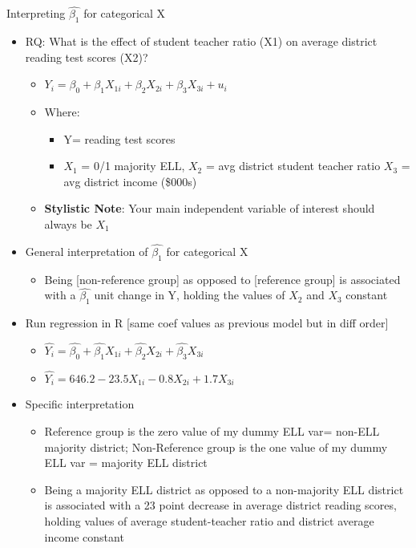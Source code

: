 \documentclass[8pt,ignorenonframetext,dvipsnames]{beamer}
\providecommand{\tightlist}{%
  \setlength{\itemsep}{0pt}\setlength{\parskip}{0pt}}
\renewcommand{\textbf}[1]{{\color{darkgray}\bfseries\fontfamily{Montserrat-TOsF}#1}}
\let\olditem\item
\renewcommand{\item}{%
  \olditem\vspace{4pt}
}
\begin{document}
\begin{frame}{Interpreting \(\hat{\beta_1}\) for categorical X}
\protect\hypertarget{interpreting-hatbeta_1-for-categorical-x}{}

\begin{itemize}
\tightlist
\item
  RQ: What is the effect of student teacher ratio (X1) on average
  district reading test scores (X2)?

  \begin{itemize}
  \tightlist
  \item
    \(Y_i = \beta_0 + \beta_1X_{1i} + \beta_2X_{2i} + \beta_3X_{3i} + u_i\)
  \item
    Where:

    \begin{itemize}
    \tightlist
    \item
      Y= reading test scores
    \item
      \(X_1\) = 0/1 majority ELL, \(X_2\) = avg district student teacher
      ratio \(X_3\) = avg district income (\$000s)
    \end{itemize}
  \item
    \textbf{Stylistic Note}: Your main independent variable of interest
    should always be \(X_1\)
  \end{itemize}
\item
  General interpretation of \(\hat{\beta_1}\) for categorical X

  \begin{itemize}
  \tightlist
  \item
    Being {[}non-reference group{]} as opposed to {[}reference group{]}
    is associated with a \(\hat{\beta_1}\) unit change in Y, holding the
    values of \(X_2\) and \(X_3\) constant
  \end{itemize}
\item
  Run regression in R {[}same coef values as previous model but in diff
  order{]}

  \begin{itemize}
  \tightlist
  \item
    \(\hat{Y_i} = \hat{\beta_0} + \hat{\beta_1} X_{1i} + \hat{\beta_2} X_{2i} + \hat{\beta_3} X_{3i}\)
  \item
    \(\hat{Y_i} = 646.2 - 23.5 X_{1i} -0.8 X_{2i} + 1.7 X_{3i}\)
  \end{itemize}
\item
  Specific interpretation

  \begin{itemize}
  \tightlist
  \item
    Reference group is the zero value of my dummy ELL var= non-ELL
    majority district; Non-Reference group is the one value of my dummy
    ELL var = majority ELL district
  \item
    Being a majority ELL district as opposed to a non-majority ELL
    district is associated with a 23 point decrease in average district
    reading scores, holding values of average student-teacher ratio and
    district average income constant
  \end{itemize}
\end{itemize}

\end{frame}
\end{document}
